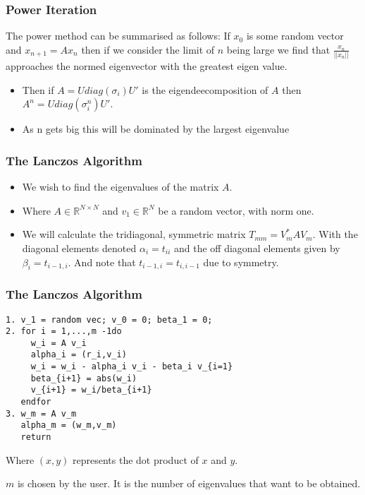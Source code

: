 \documentclass[pdf]{beamer}
\begin{document}
\begin{frame}
\frametitle{Power Iteration}

The power method can be summarised as follows: If $x_0$ is some random vector and $x_{n+1}=A x_n$ then if we consider the limit of $n$ being large we find that $\frac{x_n}{||x_n||}$ approaches the normed eigenvector with the greatest eigen value. 
\begin{itemize}
\item Then if $A=U {diag} (\sigma_i) U'$ is the eigendeecomposition of $A$ then $A^n = U {diag}(\sigma^n_i) U'$.
\item As n gets big this will be dominated by the largest eigenvalue
\end{itemize}
\end{frame}



\begin{frame}
\frametitle{The Lanczos Algorithm}
\begin{itemize}
\item We wish to find the eigenvalues of the matrix $A$.

\item Where $A \in \mathbb{R}^{N \times N}$ and $v_1 \in \mathbb{R}^N$ be a random vector, with norm one.

\item We will calculate the tridiagonal, symmetric matrix $T_{mm} = V_m^* A V_m$. With the diagonal elements denoted $\alpha_i=t_{ii}$ and the off diagonal elements given by $\beta_i = t_{i-1,i}$. And note that $t_{i-1,i}=t_{i,i-1}$ due to symmetry.
\end{itemize}

\end{frame}


\begin{frame}[fragile]
\frametitle{The Lanczos Algorithm}
\begin{verbatim}
1. v_1 = random vec; v_0 = 0; beta_1 = 0;
2. for i = 1,...,m -1do
     w_i = A v_i
     alpha_i = (r_i,v_i)
     w_i = w_i - alpha_i v_i - beta_i v_{i=1}
     beta_{i+1} = abs(w_i)
     v_{i+1} = w_i/beta_{i+1}
   endfor
3. w_m = A v_m
   alpha_m = (w_m,v_m)
   return
\end{verbatim}

Where $(x,y)$ represents the dot product of $x$ and $y$.

$m$ is chosen by the user. It is the number of eigenvalues that want to be obtained.


\end{frame}
\end{document}
